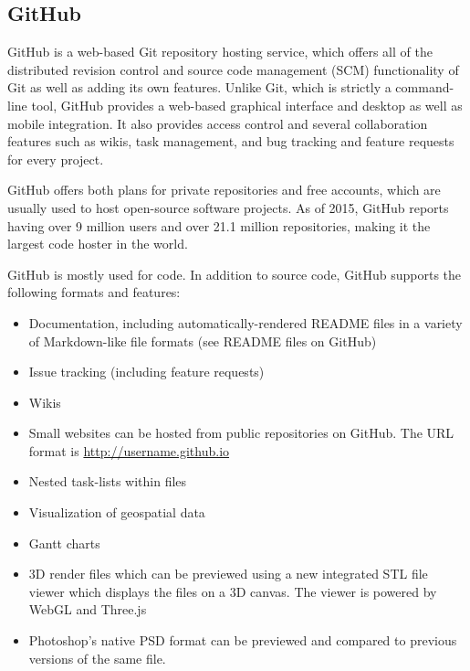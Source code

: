 \documentclass[12pt]{article}
\begin{document}
\subsection{GitHub}
GitHub is a web-based Git repository hosting service, which offers all of the distributed revision control and source code management (SCM) functionality of Git as well as adding its own features. Unlike Git, which is strictly a command-line tool, GitHub provides a web-based graphical interface and desktop as well as mobile integration. It also provides access control and several collaboration features such as wikis, task management, and bug tracking and feature requests for every project.

GitHub offers both plans for private repositories and free accounts, which are usually used to host open-source software projects. As of 2015, GitHub reports having over 9 million users and over 21.1 million repositories, making it the largest code hoster in the world.

GitHub is mostly used for code.
In addition to source code, GitHub supports the following formats and features:


\begin{itemize}

\item Documentation, including automatically-rendered README files in a variety of Markdown-like file formats (see README files on GitHub)

\item Issue tracking (including feature requests)

\item Wikis

\item Small websites can be hosted from public repositories on GitHub. The URL format is \url{http://username.github.io}

\item Nested task-lists within files

\item Visualization of geospatial data

\item Gantt charts

\item 3D render files which can be previewed using a new integrated STL file viewer which displays the files on a 3D canvas. The viewer is powered by WebGL and Three.js

\item Photoshop's native PSD format can be previewed and compared to previous versions of the same file.~\cite{wiki:github}

\end{itemize}
\end{document}
